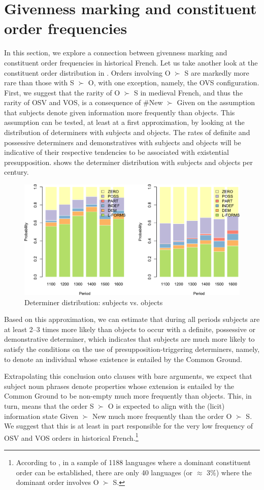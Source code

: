 \documentclass[output=paper,modfonts,nonflat]{langsci/langscibook}
\begin{document}
\section{Givenness marking and constituent order frequencies}
\label{section:orders}

In this section, we explore a connection between givenness marking and constituent order frequencies in historical French. Let us take another look at the constituent order distribution in . Orders involving O $\succ$ S are markedly more rare than those with S $\succ$ O, with one exception, namely, the OVS configuration. First, we suggest that the rarity of O $\succ$ S in medieval French, and thus the rarity of OSV and VOS, is a consequence of \#New $\succ$ Given on the assumption that subjects denote given information more frequently than objects. This assumption can be tested, at least at a first approximation, by looking at the distribution of determiners with subjects and objects. The rates of definite and possessive determiners and demonstratives with subjects and objects will be indicative of their respective tendencies to be associated with existential presupposition.  shows the determiner distribution with subjects and objects per century.

\begin{figure}
\includegraphics[width=.75\textwidth]{figures/determiners.pdf}
\caption{Determiner distribution: subjects vs. objects}\label{figure:determiners}
\end{figure}

Based on this approximation, we can estimate that during all periods subjects are at least 2--3 times more likely than objects to occur with a definite, possessive or demonstrative determiner, which indicates that subjects are much more likely to satisfy the conditions on the use of presupposition-triggering determiners, namely, to denote an individual whose existence is entailed by the Common Ground.

Extrapolating this conclusion onto clauses with bare arguments, we expect that subject noun phrases denote properties whose extension is entailed by the Common Ground to be non-empty much more frequently than objects. This, in turn, means that the order S $\succ$ O is expected to align with the (licit) information state Given $\succ$ New much more frequently than the order O $\succ$ S. We suggest that this is at least in part responsible for the very low frequency of OSV and VOS orders in historical French.\footnote{According to \citet{wals-81}, in a sample of 1188 languages where a dominant constituent order can be established, there are only 40 languages (or $\approx$ 3\%) where the dominant order involves O $\succ$ S.}
\end{document}
